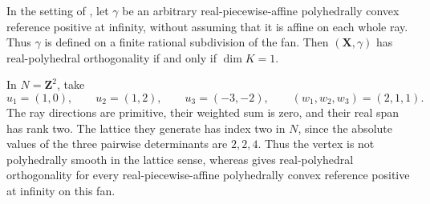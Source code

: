 \begin{corollary}
\label{cor:frontier-polyhedral-one-vertex-bounded-shift}
In the setting of
, let $\gamma$ be
an arbitrary real-piecewise-affine polyhedrally convex reference positive at
infinity, without assuming that it is affine on each whole ray.  Thus
$\gamma$ is defined on a finite rational subdivision of the fan.  Then
$(\mathbf X,\gamma)$ has real-polyhedral orthogonality if and only if
$\dim K=1$.
\end{corollary}

\begin{example}
\label{ex:frontier-polyhedral-nonsaturated-tripod}
In $N=\mathbf Z^2$, take
\[
 u_1=(1,0),\qquad u_2=(1,2),\qquad u_3=(-3,-2),
 \qquad (w_1,w_2,w_3)=(2,1,1).
\]
The ray directions are primitive, their weighted sum is zero, and their
real span has rank two.  The lattice they generate has index two in $N$,
since the absolute values of the three pairwise determinants are $2,2,4$.
Thus the vertex is not polyhedrally smooth in the lattice sense, whereas
 gives
real-polyhedral orthogonality for every real-piecewise-affine
polyhedrally convex reference positive at infinity on this fan.
\end{example}
